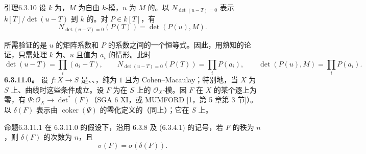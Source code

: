 \begin{SGAresult}{引理}{6.3.10}
设 $k$ 为，$M$ 为自由 $k$-模，$u$ 为 $M$ 的。以 $N_{\det(u-T)=0}$ 表示 $k[T]/\det(u-T)$ 到 $k$ 的。对 $P\in k[T]$，有
\[N_{\det(u-T)=0}(P(T))=\det(P(u),M).\]
\end{SGAresult}
所需验证的是 $u$ 的矩阵系数和 $P$ 的系数之间的一个恒等式。因此，用熟知的论证，只需处理 $k$ 为、$u$ 且值为 $a_i$ 的情形。此时
\[\det(u-T)=\prod_i(a_i-T),\qquad N_{\det(u-T)=0}(P(T))=\prod_iP(a_i),\qquad\det(P(u),M)=\prod_iP(a_i).\]
\textbf{6.3.11.0。} 设 $f:X\to S$ 是、、，纯为 $1$ 且为 Cohen--Macaulay；特别地，当 $X$ 为 $S$ 上、曲线时这些条件成立。设 $F$ 为在 $S$ 上的 $\mathcal O_X$-模。因 $F$ 在 $X$ 的某个逐上为零，有 $\Psi:\mathcal O_X\to\det^*(F)$（SGA 6 XI，或 MUMFORD [1，第 5 章第 3 节]）。以 $\delta(F)$ 表示由 $\operatorname{coker}(\Psi)$ 的零化定义的（同上）；它在 $S$ 上。
\begin{SGAresult}{命题}{6.3.11.1}
在 6.3.11.0 的假设下，沿用 6.3.8 及 (6.3.4.1) 的记号，若 $F$ 的秩为 $n$，则 $\delta(F)$ 的次数为 $n$，且
\[\sigma(F)=\sigma(\delta(F)).\]
\end{SGAresult}
